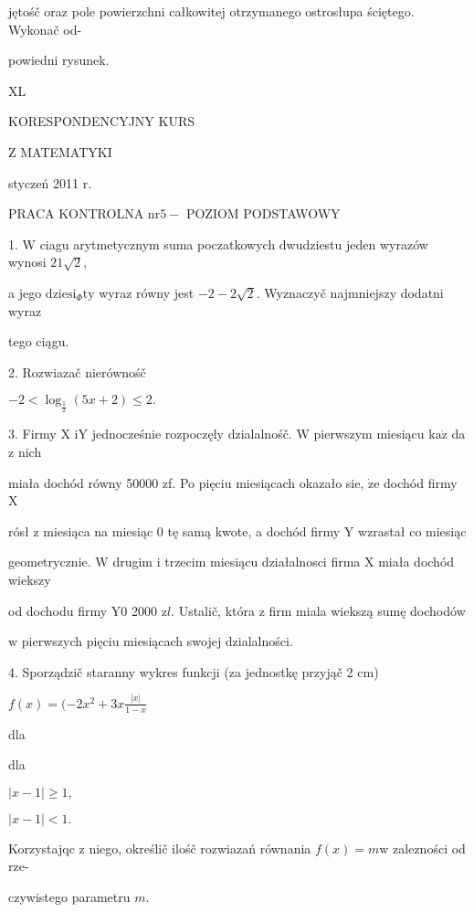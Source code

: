 \documentclass[a4paper,12pt]{article}
\begin{document}
jętośč oraz pole powierzchni całkowitej otrzymanego ostrosłupa ściętego. Wykonač od-

powiedni rysunek.





XL

KORESPONDENCYJNY KURS

Z MATEMATYKI

styczeń 2011 r.

PRACA KONTROLNA $\mathrm{n}\mathrm{r} 5-$ POZIOM PODSTAWOWY

1. $\mathrm{W}$ ciagu arytmetycznym suma poczatkowych dwudziestu jeden wyrazów wynosi $21\sqrt{2},$

a jego $\mathrm{d}\mathrm{z}\mathrm{i}\mathrm{e}\mathrm{s}\mathrm{i}_{\Phi}\mathrm{t}\mathrm{y}$ wyraz równy jest $-2-2\sqrt{2}$. Wyznaczyč najmniejszy dodatni wyraz

tego ciągu.

2. Rozwiazač nierównośč

$-2<\log_{\frac{1}{2}}(5x+2)\leq 2.$

3. Firmy X $\mathrm{i}\mathrm{Y}$ jednocześnie rozpoczęly dzialalnośč. $\mathrm{W}$ pierwszym miesiącu $\mathrm{k}\mathrm{a}\dot{\mathrm{z}}$ da $\mathrm{z}$ nich

miała dochód równy 50000 zf. Po pięciu miesiącach okazało sie, $\dot{\mathrm{z}}\mathrm{e}$ dochód firmy X

rósł $\mathrm{z}$ miesiąca na miesiąc $0$ tę samą kwote, a dochód firmy $\mathrm{Y}$ wzrastał co miesiąc

geometrycznie. $\mathrm{W}$ drugim $\mathrm{i}$ trzecim miesiącu działalnosci firma X miała dochód wiekszy

od dochodu firmy $\mathrm{Y} 0$ 2000 $\mathrm{z}l$. Ustalič, która $\mathrm{z}$ firm miala wiekszą sumę dochodów

$\mathrm{w}$ pierwszych pięciu miesiącach swojej dzialalności.

4. Sporządzič staranny wykres funkcji (za jednostkę przyjąč 2 cm)

$f(x)=(-2x^{2}+3x\displaystyle \frac{|x|}{1-x}$

dla

dla

$|x-1|\geq 1,$

$|x-1|<1.$

Korzystajqc $\mathrm{z}$ niego, określič ilośč rozwiazań równania $f(x) =m \mathrm{w}$ zalezności od rze-

czywistego parametru $m.$
\end{document}
